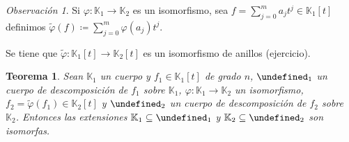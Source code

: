 \documentclass[10pt, spanish]{report}
\newtheorem{tma}{Teorema}[chapter]
\theoremstyle{definition}
\theoremstyle{custom}
\theoremstyle{remark}
\newtheorem*{obs}{Observación}
\newcommand{\K}{\mathbb{K}}
\let\L\undefined
\newcommand{\L}{\mathbb{L}}
\begin{document}
\begin{obs}
    Si $\varphi:\K_1 \to \K_2$ es un isomorfismo, sea $f=\sum_{j=0}^ma_jt^j\in
    \K_1[t]$ definimos $\tilde{\varphi}(f)\coloneqq\sum_{j=0}^m\varphi(a_j)t^j$.

    Se tiene que $\tilde{\varphi}:\K_1[t]\to \K_2[t]$ es un isomorfismo de
    anillos (ejercicio).
\end{obs}

\begin{tma}
    Sean $\K_1$ un cuerpo y $f_1\in\K_1[t]$ de grado $n$, $\L_1$ un cuerpo de
    descomposición de $f_1$ sobre $\K_1$, $\varphi:\K_1\to\K_2$ un isomorfismo,
    $f_2=\tilde{\varphi}(f_1)\in\K_2[t]$ y $\L_2$ un cuerpo de descomposición de
    $f_2$ sobre $\K_2$. Entonces las extensiones $\K_1\subseteq\L_1$ y
    $\K_2\subseteq\L_2$ son isomorfas.
\end{tma}
\end{document}
